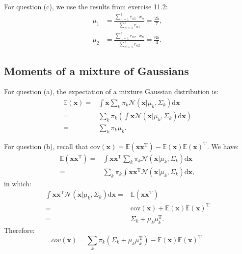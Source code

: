 \documentclass[UTF8]{ctexart}
\begin{document}
For question (c), we use the results from exercise 11.2:
$$
\begin{aligned}
\mu_{1}&=\frac{\sum_{n=1}^{3}r_{n1}\cdot x_{n}}{\sum_{n=1}^{3}r_{n1}}=\frac{25}{7},\\
\mu_{2}&=\frac{\sum_{n=1}^{3}r_{n2}\cdot x_{n}}{\sum_{n=1}^{3}r_{n2}}=\frac{65}{4}.
\end{aligned}
$$

\subsection{Moments of a mixture of Gaussians}
For question (a), the expectation of a mixture Gaussian distribution is:
\begin{align}
\mathbb{E}(\textbf{x})=&\int\textbf{x}\sum_{k}\pi_{k}\mathcal{N}(\textbf{x}|\mu_{k},\Sigma_{k})\text{d}\textbf{x}\nonumber \\
=&\sum_{k}\pi_{k}\left(\int\textbf{x}\mathcal{N}(\textbf{x}|\mu_{k},\Sigma_{k})\text{d}\textbf{x}\right)\nonumber \\
=&\sum_{k}\pi_{k}\mu_{k}.\nonumber
\end{align}

For question (b), recall that $\text{cov}(\textbf{x})=\mathbb{E}(\textbf{x}\textbf{x}^{\text{T}})-\mathbb{E}(\textbf{x})\mathbb{E}(\textbf{x})^{\text{T}}$.
We have:
\begin{align}
\mathbb{E}(\textbf{x}\textbf{x}^{\text{T}})=&\int \textbf{x}\textbf{x}^{\text{T}}\sum_{k}\pi_{k}\mathcal{N}(\textbf{x}|\mu_{k},\Sigma_{k})\text{d}\textbf{x}\nonumber \\
=&\sum_{k}\pi_{k}\int \textbf{x}\textbf{x}^{\text{T}}\mathcal{N}(\textbf{x}|\mu_{k},\Sigma_{k})\text{d}\textbf{x},\nonumber
\end{align}
in which:
\begin{align}
\int \textbf{x}\textbf{x}^{\text{T}}\mathcal{N}(\textbf{x}|\mu_{k},\Sigma_{k})\text{d}\textbf{x}=&\mathbb{E}(\textbf{x}\textbf{x}^{\text{T}})\nonumber \\
=&\text{cov}(\textbf{x})+\mathbb{E}(\textbf{x})\mathbb{E}(\textbf{x})^{\text{T}} \nonumber \\
=&\Sigma_{k}+\mu_{k}\mu_{k}^{\text{T}}.\nonumber
\end{align}
Therefore:
$$cov(\textbf{x})=\sum_{k}\pi_{k}(\Sigma_{k}+\mu_{k}\mu_{k}^{\text{T}})-\mathbb{E}(\textbf{x})\mathbb{E}(\textbf{x})^{\text{T}}.$$
\end{document}
